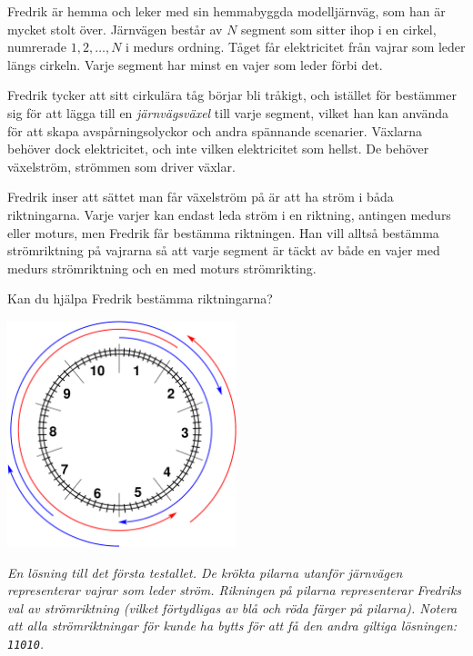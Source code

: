 \ifx\boi\undefined\fi
\def\version{jury-1}
Fredrik är hemma och leker med sin hemmabyggda modelljärnväg, som han är mycket stolt över.
Järnvägen består av $N$ segment som sitter ihop i en cirkel, numrerade $1, 2, \dots, N$ i medurs ordning.
Tåget får elektricitet från vajrar som leder längs cirkeln. Varje segment har minst en vajer som leder förbi det. 

Fredrik tycker att sitt cirkulära tåg börjar bli tråkigt, och istället för bestämmer sig för att lägga till en \emph{järnvägsväxel} till varje segment, vilket han kan använda för att skapa avspårningsolyckor och andra spännande scenarier.
Växlarna behöver dock elektricitet, och inte vilken elektricitet som hellst. 
De behöver växelström, strömmen som driver växlar.

Fredrik inser att sättet man får växelström på är att ha ström i båda riktningarna.
Varje varjer kan endast leda ström i en riktning, antingen medurs eller moturs, 
men Fredrik får bestämma riktningen. Han vill alltså bestämma strömriktning på vajrarna
så att varje segment är täckt av både en vajer med medurs strömriktning och en med moturs
strömrikting.

Kan du hjälpa Fredrik bestämma riktningarna?

\vspace{2mm}
\begin{center}
\includegraphics[width=0.5\textwidth]{alternatingfig.pdf}
\end{center}
\vspace{1mm}
{\em En lösning till det första testallet. De krökta pilarna utanför järnvägen representerar 
vajrar som leder ström. Rikningen på pilarna representerar Fredriks val av strömriktning (vilket förtydligas av blå och röda färger på pilarna). Notera att alla strömriktningar för kunde ha bytts för att få den andra giltiga lösningen: \texttt{11010}.}

